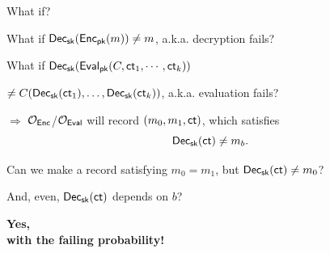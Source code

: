 \documentclass{beamer}
\begin{document}
    \begin{frame}{What if?}

    What if \textcolor{blue}{${\sf Dec}_{\sf sk}({\sf Enc}_{\sf pk}(m)) \neq m$}, a.k.a. decryption fails?\vspace{0.2cm}\pause

    What if \textcolor{blue}{${\sf Dec}_{\sf sk}({\sf Eval}_{\sf pk}(C, {\sf ct}_1, \cdots, {\sf ct}_k))$}

    \hfill \textcolor{blue}{$\neq C({\sf Dec}_{\sf sk}({\sf ct}_1), \dots, {\sf Dec}_{\sf sk}({\sf ct}_k))$},
    a.k.a. evaluation fails? \vspace{0.4cm}\pause

    $\Rightarrow$ ${\mathcal O}_{\sf Enc}$/${\mathcal O}_{\sf Eval}$ will record $(m_0, m_1, {\sf ct})$, which satisfies 
    \[
        {\sf Dec}_{\sf sk}({\sf ct}) \neq m_b.
    \]\pause

    Can we make a record satisfying $m_0 = m_1$, but ${\sf Dec}_{\sf sk}({\sf ct}) \neq m_0$?\vspace{0.3cm}\pause
        
    And, even, ${\sf Dec}_{\sf sk}({\sf ct})$ depends on $b$? 
    \end{frame}

    \begin{frame}{}
    \begin{center}
        {\Large \bf Yes,\\\vspace{0.2cm} 
        with the failing probability!}
    \end{center} 
    \end{frame}
    
\end{document}
